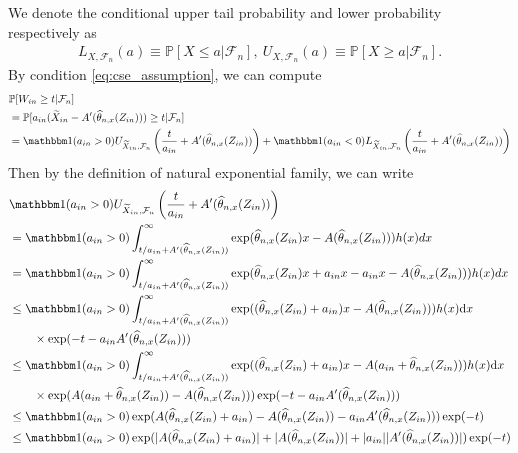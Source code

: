 \documentclass[12pt]{article}
\theoremstyle{definition}
\def\P{\mathbb{P}}
\def\P{\mathbb{P}}
\renewcommand{\P}{\mathbb{P}}							%
\newcommand{\indicator}{\mathbbm 1}						%
\newcommand{\srz}{Z}									%
\newcommand{\srxk}{\widetilde X}						%
\begin{document}
We denote the conditional upper tail probability and lower probability respectively as 
\begin{align*}
  L_{X,\mathcal{F}_n}(a)\equiv \P\left[X\leq a|\mathcal{F}_n\right],\ U_{X,\mathcal{F}_n}(a)\equiv \P\left[X\geq a|\mathcal{F}_n\right].
\end{align*}
By condition \eqref{eq:cse_assumption}, we can compute 
\begin{align*}
  &
  \P[W_{in}\geq t|\mathcal{F}_n]\\
  &
  =\P[a_{in}(\srxk_{in}-A'(\widehat \theta_{n,x}(\srz_{in})))\geq t|\mathcal{F}_n]\\
  &
  =\indicator(a_{in}>0)U_{\srxk_{in},\mathcal{F}_n}\left(\frac{t}{a_{in}}+A'(\widehat{\theta}_{n,x}(\srz_{in}))\right)+\indicator(a_{in}<0)L_{\srxk_{in},\mathcal{F}_n}\left(\frac{t}{a_{in}}+A'(\widehat{\theta}_{n,x}(\srz_{in}))\right)
\end{align*}
Then by the definition of natural exponential family, we can write 
\begin{align*}
  &
  \indicator(a_{in}>0)U_{\srxk_{in},\mathcal{F}_n}\left(\frac{t}{a_{in}}+A'(\widehat{\theta}_{n,x}(\srz_{in}))\right)\\
  &
  =\indicator(a_{in}>0)\int_{t/a_{in}+A'(\widehat{\theta}_{n,x}(\srz_{in}))}^{\infty}\exp(\widehat{\theta}_{n,x}(\srz_{in})x-A(\widehat{\theta}_{n,x}(\srz_{in})))h(x)dx\\
  &
  =\indicator(a_{in}>0)\int_{t/a_{in}+A'(\widehat{\theta}_{n,x}(\srz_{in}))}^{\infty}\exp(\widehat{\theta}_{n,x}(\srz_{in})x+a_{in}x -a_{in}x-A(\widehat{\theta}_{n,x}(\srz_{in})))h(x)dx\\
  &
  \leq \indicator(a_{in}>0)\int_{t/a_{in}+A'(\widehat{\theta}_{n,x}(\srz_{in}))}^{\infty}\exp((\widehat{\theta}_{n,x}(\srz_{in})+a_{in})x-A(\widehat{\theta}_{n,x}(\srz_{in})))h(x)\mathrm{d}x\\
  &
  \qquad\times \exp(-t-a_{in}A'(\widehat{\theta}_{n,x}(\srz_{in})))\\
  &
  \leq \indicator(a_{in}>0)\int_{t/a_{in}+A'(\widehat{\theta}_{n,x}(\srz_{in}))}^{\infty}\exp((\widehat{\theta}_{n,x}(\srz_{in})+a_{in})x-A(a_{in}+\widehat{\theta}_{n,x}(\srz_{in})))h(x)\mathrm{d}x\\
  &
  \qquad\times \exp(A(a_{in}+\widehat{\theta}_{n,x}(\srz_{in}))-A(\widehat{\theta}_{n,x}(\srz_{in})))\exp(-t-a_{in}A'(\widehat{\theta}_{n,x}(\srz_{in})))\\
  &
  \leq \indicator(a_{in}>0)\exp(A(\widehat{\theta}_{n,x}(\srz_{in})+a_{in})-A(\widehat{\theta}_{n,x}(\srz_{in}))-a_{in}A'(\widehat{\theta}_{n,x}(\srz_{in})))\exp(-t)\\
  &
  \leq \indicator(a_{in}>0)\exp(|A(\widehat{\theta}_{n,x}(\srz_{in})+a_{in})|+|A(\widehat{\theta}_{n,x}(\srz_{in}))|+|a_{in}||A'(\widehat{\theta}_{n,x}(\srz_{in}))|)\exp(-t)
\end{align*}
\end{document}
